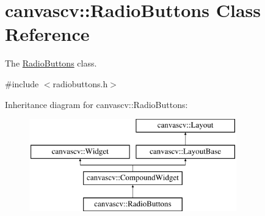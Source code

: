 \hypertarget{classcanvascv_1_1RadioButtons}{}\section{canvascv\+:\+:Radio\+Buttons Class Reference}
\label{classcanvascv_1_1RadioButtons}


The \hyperlink{classcanvascv_1_1RadioButtons}{Radio\+Buttons} class.  




{\ttfamily \#include $<$radiobuttons.\+h$>$}

Inheritance diagram for canvascv\+:\+:Radio\+Buttons\+:\begin{figure}[H]
\begin{center}
\leavevmode
\includegraphics[height=4.000000cm]{classcanvascv_1_1RadioButtons}
\end{center}
\end{figure}
